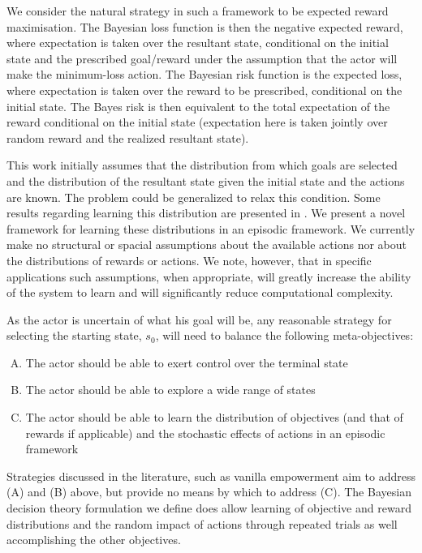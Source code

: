 \documentclass{article}
\begin{document}
We consider the natural strategy in such a framework to be expected reward maximisation. The Bayesian loss function is then the negative expected reward, where expectation is taken over the resultant state, conditional on the initial state and the prescribed goal/reward under the assumption that the actor will make the minimum-loss action. The Bayesian risk function is the expected loss, where expectation is taken over the reward to be prescribed, conditional on the initial state. The Bayes risk is then equivalent to the total expectation of the reward conditional on the initial state (expectation here is taken jointly over random reward and the realized resultant state). 

This work initially assumes that the distribution from which goals are selected and the distribution of the resultant state given the initial state and the actions are known. The problem could be generalized to relax this condition. Some results regarding learning this distribution are presented in \cite{depeweg2016learning}. We present a novel framework for learning these distributions in an episodic framework. We currently make no structural or spacial assumptions about the available actions nor about the distributions of rewards or actions. We note, however, that in specific applications such assumptions, when appropriate, will greatly increase the ability of the system to learn and will significantly reduce computational complexity.

As the actor is uncertain of what his goal will be, any reasonable strategy for selecting the starting state, $s_0$, will need to balance the following meta-objectives:
\begin{enumerate}[(A)]
\item The actor should be able to exert control over the terminal state
\item The actor should be able to explore a wide range of states 
\item The actor should be able to learn the distribution of objectives (and that of rewards if applicable) and the stochastic effects of actions in an episodic framework
\end{enumerate}
Strategies discussed in the literature, such as vanilla empowerment \cite{mohamed2015variational, salge2014empowerment, chentanez2004intrinsically} aim to address (A) and (B) above, but provide no means by which to address (C). 
The Bayesian decision theory formulation we define does allow learning of objective and reward distributions and the random impact of actions through repeated trials as well accomplishing the other objectives.
\end{document}
